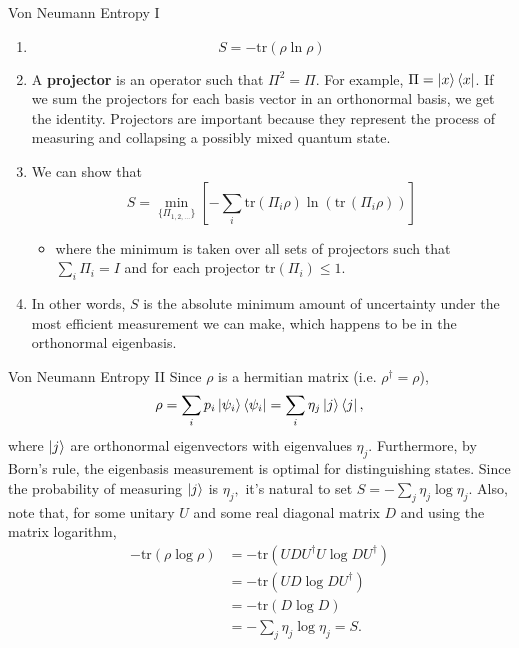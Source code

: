 \documentclass{beamer}
\begin{document}
\begin{frame}{Von Neumann Entropy I}
    
    \begin{enumerate}
        \item \[S = -\mathrm{tr}(\rho \ln \rho)\]
        \item A \textbf{projector} is an operator such that $\Pi^2 = \Pi$. For example, $\Pi= \ket{x}\bra{x}$. If we sum the projectors for each basis vector in an orthonormal basis, we get the identity. Projectors are important because they represent the process of measuring and collapsing a possibly mixed quantum state.
        \item We can show that \[S = \min_{\{\Pi_{1,2,\dots}\}} \left[ -\sum_i\mathrm{tr} (\Pi_i\rho) \ln(  \mathrm{tr}\,(\Pi_i \rho)) \right]\]
        \begin{itemize}
            \item where the minimum is taken over all sets of projectors such that $\sum_i \Pi_i = I$ and for each projector $\mathrm{tr}(\Pi_i)\le1$.
        \end{itemize} 
        \item In other words, $S$ is the absolute minimum amount of uncertainty under the most efficient measurement we can make, which happens to be in the orthonormal eigenbasis.
    \end{enumerate}
\end{frame}
\begin{frame}{Von Neumann Entropy II}
Since $\rho$ is a hermitian matrix (i.e. $\rho^\dagger=\rho$),
    \[\rho=\sum_i p_i\ket{\psi_i}\bra{\psi_i}=\sum_i\eta_j\ket{j}\bra{j},\]
where $\ket{j}$ are orthonormal eigenvectors with eigenvalues $\eta_j.$ Furthermore, by Born's rule, the eigenbasis measurement is optimal for distinguishing states. Since the probability of measuring $\ket{j}$ is $\eta_j,$ it's natural to set 
$S=-\sum_j\eta_j\log\eta_j.$ Also, note that, for some unitary $U$ and some real diagonal matrix $D$ and using the matrix logarithm,
\begin{align*}-\mathrm{tr}(\rho\log\rho)&=-\mathrm{tr}(UDU^\dagger U\log D U^\dagger)\\&=-\mathrm{tr}(UD\log D U^\dagger)\\&=-\mathrm{tr}(D\log D)\\&=-\sum_j \eta_j\log \eta_j=S.\end{align*}
\end{frame}
\end{document}
